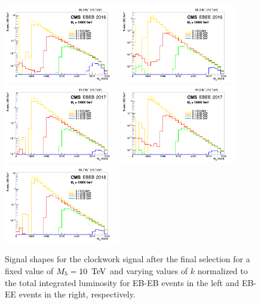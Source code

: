 \begin{figure}[htbp!]
\caption{Signal shapes for the clockwork signal after the final selection for a fixed value of $M_5 = 10~\,\text{Te\hspace{-.08em}V}$ and varying values of $k$ normalized to the total integrated luminosity for EB-EB events in the left and EB-EE events in the right, respectively.}
\begin{center}
 \includegraphics[angle=0,width=0.45\textwidth]{fig/2016EBEB.png}\hfill
    \includegraphics[angle=0,width=0.45\textwidth]{fig/2016EBEE.png}\\[0.5em]
    \includegraphics[angle=0,width=0.45\textwidth]{fig/2017EBEB.png}\hfill
    \includegraphics[angle=0,width=0.45\textwidth]{fig/2017EBEE.png}\\[0.5em]
    \includegraphics[angle=0,width=0.45\textwidth]{fig/2018EBEB.png}\hfill

\end{center}
\end{figure}
